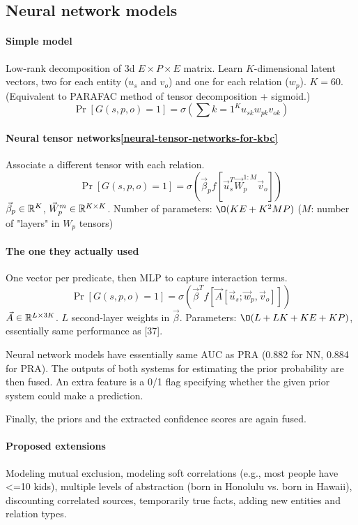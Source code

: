 \subsection{Neural network models}

\paragraph{Simple model}
Low-rank decomposition of 3d $E\times P\times E$ matrix. Learn $K$-dimensional
latent vectors, two for each entity ($u_s$ and $v_o$) and one for each relation
($w_p$). $K=60$. (Equivalent to PARAFAC method of tensor decomposition +
sigmoid.)
$$\Pr[G(s,p,o)=1] = \sigma(\sum\limits{k=1}^K u_{sk} w_{pk} v_{ok})$$

\paragraph{Neural tensor networks\ref{neural-tensor-networks-for-kbc}}
Associate a different tensor with each relation.
$$\Pr[G(s,p,o)=1] = \sigma(\vec{\beta}_p f[\vec{u}_s^T \vec{W}_p^{1:M} \vec{v}_o])$$
$\vec{\beta}_p\in\mathbb{R}^K$, $\vec{W}_p^m\in\mathbb{R}^{K\times K}$.
Number of parameters: $\O(KE+K^2 MP)$ ($M$: number of "layers" in $W_p$ tensors)

\paragraph{The one they actually used}
One vector per predicate, then MLP to capture interaction terms.
$$\Pr[G(s,p,o)=1]=\sigma(\vec{\beta}^T f[\vec{A} [\vec{u}_s; \vec{w}_p, \vec{v}_o] ])$$
$\vec{A}\in\mathbb{R}^{L\times 3K}$.
$L$ second-layer weights in $\vec{\beta}$.
Parameters: $\O(L+LK+KE+KP)$, essentially same performance as [37].

Neural network models have essentially same AUC as PRA
(0.882 for NN, 0.884 for PRA).
The outputs of both systems for estimating the prior probability are then
fused. An extra feature is a 0/1 flag specifying whether the given prior system
could make a prediction.

Finally, the priors and the extracted confidence scores are again fused.

\paragraph{Proposed extensions}
Modeling mutual exclusion, modeling soft correlations
(e.g., most people have <=10 kids), multiple levels of abstraction (born in
Honolulu vs. born in Hawaii), discounting correlated sources, temporarily true
facts, adding new entities and relation types.

